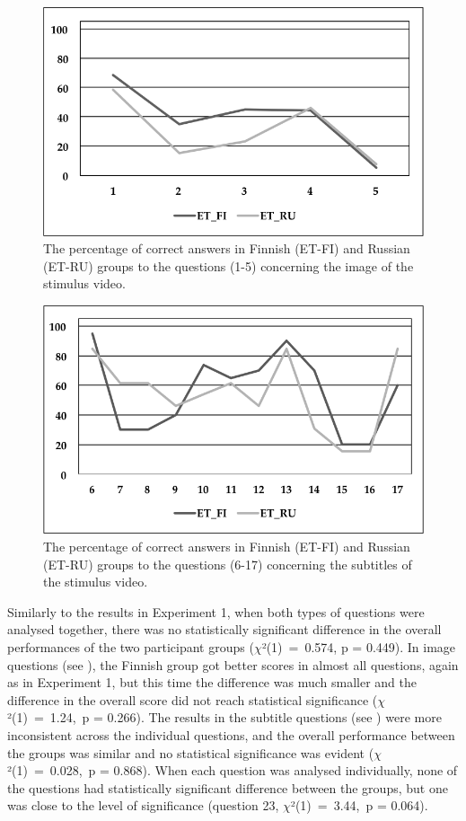 \documentclass[output=paper]{langsci/langscibook}
\begin{document}
\begin{figure}[h]
 \includegraphics[width=\textwidth]{figures/Lang3.png}
 \caption{The percentage of correct answers in Finnish (ET-FI) and Russian (ET-RU) groups to the questions (1-5) concerning the image of the stimulus video.}
 \label{lang:fig:3}
\end{figure} 

\begin{figure}[h]
 \includegraphics[width=\textwidth]{figures/Lang4.png}
 \caption{The percentage of correct answers in Finnish (ET-FI) and Russian (ET-RU) groups to the questions (6-17) concerning the subtitles of the stimulus video.}
 \label{lang:fig:4}
\end{figure} 

Similarly to the results in Experiment 1, when both types of questions were analysed together, there was no statistically significant difference in the overall performances of the two participant groups ($\chi $²(1)~=~0.574, p = 0.449). In image questions (see ), the Finnish group got better scores in almost all questions, again as in Experiment 1, but this time the difference was much smaller and the difference in the overall score did not reach statistical significance ($\chi $²(1)~=~1.24,~p = 0.266). The results in the subtitle questions (see ) were more inconsistent across the individual questions, and the overall performance between the groups was similar and no statistical significance was evident ($\chi $²(1)~=~0.028,~p = 0.868). When each question was analysed individually, none of the questions had statistically significant difference  between the groups, but one was close to the level of significance (question 23, $\chi $²(1)~=~3.44,~p = 0.064).
\end{document}
